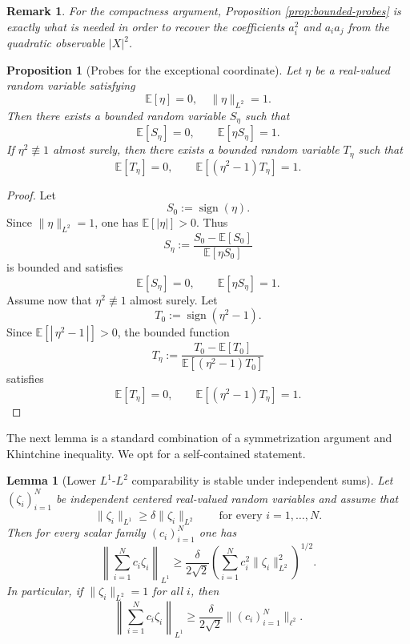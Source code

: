 \documentclass[11pt]{amsart}
\newtheorem{proposition}[theorem]{Proposition}
\newtheorem{lemma}[theorem]{Lemma}
\newtheorem{remark}[theorem]{Remark}
\newcommand{\E}{\mathbb E}
\begin{document}
\begin{remark}
For the compactness argument, Proposition \ref{prop:bounded-probes} is exactly
what is needed in order to recover the coefficients $a_i^2$ and $a_i a_j$ from
the quadratic observable $|X|^2$.
\end{remark}

\begin{proposition}[Probes for the exceptional coordinate]
\label{prop:exceptional-probes}
Let $\eta$ be a real-valued random variable satisfying
\[
\E[\eta]=0, \quad \|\eta\|_{L^2}=1.
\]
Then there exists a bounded random variable $S_\eta$ such that
\[
\E[S_\eta]=0,
\qquad
\E[\eta S_\eta]=1.
\]
If $\eta^2 \not \equiv  1$ almost surely, then there exists a bounded random variable
$T_\eta$ such that
\[
\E[T_\eta]=0,
\qquad
\E[(\eta^2-1)T_\eta]=1.
\]
\end{proposition}

\begin{proof}
Let
\[
S_0 := \operatorname{sign}(\eta).
\]
Since $\|\eta\|_{L^2}=1$, one has $\E[|\eta|]>0$. Thus
\[
S_\eta := \frac{S_0-\E[S_0]}{\E[\eta S_0]}
\]
is bounded and satisfies
\[
\E[S_\eta]=0,
\qquad
\E[\eta S_\eta]=1.
\]
Assume now that $\eta^2 \not \equiv 1$ almost surely. Let
\[
T_0 := \operatorname{sign}(\eta^2-1).
\]
Since $\E[|\,\eta^2-1\,|]>0$, the bounded function
\[
T_\eta := \frac{T_0-\E[T_0]}{\E[(\eta^2-1)T_0]}
\]
satisfies
\[
\E[T_\eta]=0,
\qquad
\E[(\eta^2-1)T_\eta]=1.
\]
\end{proof}
The next lemma is a standard combination of a symmetrization argument and Khintchine inequality. We opt for a self-contained statement.

\begin{lemma}[Lower $L^1$-$L^2$ comparability is stable under independent sums]
\label{lem:l1l2-linear-combinations}
Let $(\zeta_i)_{i=1}^N$ be independent centered real-valued random variables and
assume that
\[
\|\zeta_i\|_{L^1} \ge \delta \|\zeta_i\|_{L^2}
\qquad
\text{for every } i=1,\dots,N.
\]
Then for every scalar family $(c_i)_{i=1}^N$ one has
\[
\left\|\sum_{i=1}^N c_i \zeta_i \right\|_{L^1}
\ge
\frac{\delta}{2\sqrt 2}
\left(\sum_{i=1}^N c_i^2 \|\zeta_i\|_{L^2}^2 \right)^{1/2}.
\]
In particular, if $\|\zeta_i\|_{L^2}=1$ for all $i$, then
\[
\left\|\sum_{i=1}^N c_i \zeta_i \right\|_{L^1}
\ge
\frac{\delta}{2\sqrt 2}\|(c_i)_{i=1}^N\|_{\ell^2}.
\]
\end{lemma}
\end{document}
